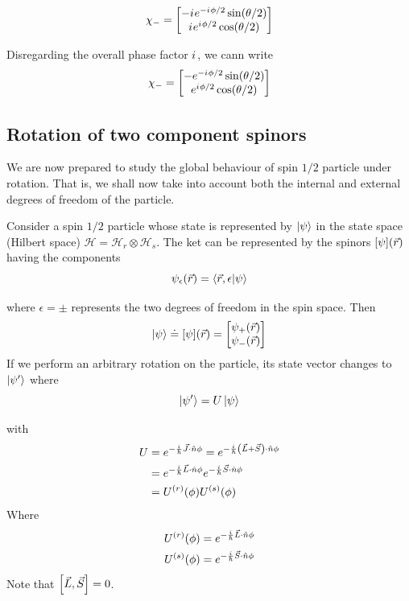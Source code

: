 \begin{equation}
\chi_{-} = \mqty[- \iu e^{-\iu \phi/2}\sin(\theta/2) \\ \iu e^{\iu \phi/2}\cos(\theta/2)]
\end{equation}

Disregarding the overall phase factor ${i\mkern1mu}$, we cann write
\begin{equation}
\chi_{-} = \mqty[- e^{-\iu \phi/2}\sin(\theta/2) \\ e^{\iu \phi/2}\cos(\theta/2)]
\end{equation}



\subsection{Rotation of two component spinors}
We are now prepared to study the global behaviour of spin $1/2$ particle under rotation. That is, we shall now take into account both the internal and external degrees of freedom of the particle.


Consider a spin $1/2$ particle whose state is represented by $\ket{\psi}$ in the state space (Hilbert space) $\mathcal{H} = \mathcal{H}_{r}\otimes \mathcal{H}_{s}$. The ket can be represented by the spinors $\qty[\psi]\qty(\vec{r})$ having the components
\begin{equation}
\psi_\epsilon\qty(\vec{r}) = \braket{\vec{r}, \epsilon}{\psi}
\end{equation} 

where $\epsilon = \pm$ represents the two degrees of freedom in the spin space. Then
\begin{equation}
\ket{\psi} \doteq \qty[\psi] \qty(\vec{r}) = \mqty[\psi_{+}\qty(\vec{r}) \\ \psi_{-}\qty(\vec{r})]
\end{equation}
If we perform an arbitrary rotation on the particle, its state vector changes to $\ket{\psi^\prime}$ where
\begin{equation}
\ket{\psi^\prime} = U \ket{\psi}
\end{equation}

with
\begin{align*}
 U 
 &= e^{-\frac{{i\mkern1mu}}{\hbar} \vec{J}\cdot \hat{n} \phi} = e^{-\frac{{i\mkern1mu}}{\hbar} \qty(\vec{L} + \vec{S})\cdot \hat{n} \phi} \\
 &= e^{-\frac{{i\mkern1mu}}{\hbar} \vec{L}\cdot \hat{n} \phi} e^{-\frac{{i\mkern1mu}}{\hbar} \vec{S}\cdot \hat{n} \phi} \\
 &= U^{(r)}\qty(\phi) U^{(s)}\qty(\phi)
\end{align*}
Where
\begin{align}
U^{(r)}\qty(\phi) &= e^{-\frac{{i\mkern1mu}}{\hbar} \vec{L}\cdot \hat{n} \phi} \\
U^{(s)}\qty(\phi) &= e^{-\frac{{i\mkern1mu}}{\hbar} \vec{S}\cdot \hat{n} \phi} 
\end{align}
Note that $\comm{\vec{L}}{\vec{S}} = 0$.\\

